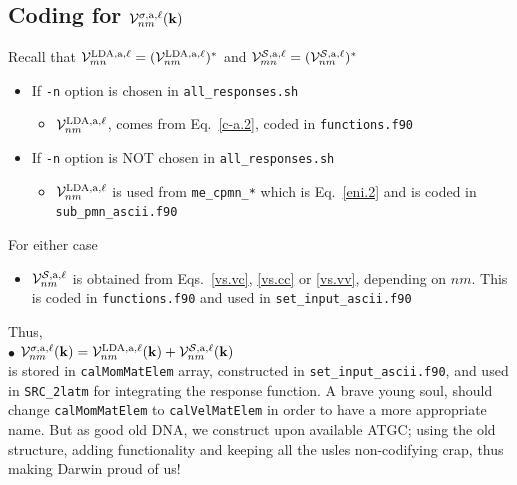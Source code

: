 \subsection{Coding for ${\mathbf{\cal V}}^{\sigma,\mathrm{a},\ell}_{nm}(\mathbf{k})$} 
Recall that 
${\mathbf{\cal V}}^{\mathrm{LDA},\mathrm{a},\ell}_{mn}=({\mathbf{\cal V}}^{\mathrm{LDA},\mathrm{a},\ell}_{nm})^*$
and 
${\mathbf{\cal V}}^{{\cal S},\mathrm{a},\ell}_{mn}=({\mathbf{\cal V}}^{{\cal S},\mathrm{a},\ell}_{nm})^*$ 
\begin{itemize}
\item If \verb=-n= option is chosen in \verb=all_responses.sh=
\begin{itemize}
\item ${\mathbf{\cal V}}^{\mathrm{LDA},\mathrm{a},\ell}_{nm}$, comes from
  Eq.~\eqref{c-a.2}, coded in \verb=functions.f90=
\end{itemize}
\item If \verb=-n= option is NOT chosen in \verb=all_responses.sh=
\begin{itemize}
\item ${\mathbf{\cal V}}^{\mathrm{LDA},\mathrm{a},\ell}_{nm}$ 
is used from \verb=me_cpmn_*=
  which is Eq.~\eqref{eni.2} and is coded in \verb=sub_pmn_ascii.f90=
\end{itemize}
\end{itemize}
For either case
\begin{itemize}
\item ${\mathbf{\cal V}}^{{\cal S},\mathrm{a},\ell}_{nm}$ 
is obtained from
  Eqs.~\eqref{vs.vc}, \eqref{vs.cc} or \eqref{vs.vv}, depending on
  $nm$. This is coded in \verb=functions.f90= and used in 
\verb=set_input_ascii.f90=  
\end{itemize}
Thus,\\
$\bullet$ 
${\mathbf{\cal V}}^{\sigma,\mathrm{a},\ell}_{nm}(\mathbf{k})={\mathbf{\cal V}}^{\mathrm{LDA},\mathrm{a},\ell}_{nm}(\mathbf{k})+{\mathbf{\cal V}}^{{\cal S},\mathrm{a},\ell}_{nm}(\mathbf{k})$\\ 
is stored in \verb=calMomMatElem=  
array, constructed in 
\verb=set_input_ascii.f90=, and used in \verb=SRC_2latm= for
integrating the response function. A brave young soul, should change   
\verb=calMomMatElem= to \verb=calVelMatElem= in order to have a more
appropriate name. But as good old DNA, we construct upon available
ATGC; using the old structure, adding functionality and  keeping all
the usles non-codifying crap, thus making Darwin
 proud of us! 

